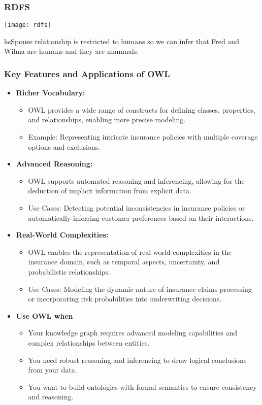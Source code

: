 \begin{frame}[fragile]\frametitle{RDFS}

\begin{center}
\texttt{[image: rdfs]}
\end{center}	  

hsSpouse relationship is restricted to humans so we can infer that Fred and Wilma are humans and they are mammals.
\end{frame}


\begin{frame}[fragile]
\frametitle{Key Features and Applications of OWL}
\begin{itemize}
\item \textbf{Richer Vocabulary:}
\begin{itemize}
\item OWL provides a wide range of constructs for defining classes, properties, and relationships, enabling more precise modeling.
\item Example: Representing intricate insurance policies with multiple coverage options and exclusions.
\end{itemize}

\item \textbf{Advanced Reasoning:}
\begin{itemize}
\item OWL supports automated reasoning and inferencing, allowing for the deduction of implicit information from explicit data.
\item Use Cases: Detecting potential inconsistencies in insurance policies or automatically inferring customer preferences based on their interactions.
\end{itemize}

\item \textbf{Real-World Complexities:}
\begin{itemize}
\item OWL enables the representation of real-world complexities in the insurance domain, such as temporal aspects, uncertainty, and probabilistic relationships.
\item Use Cases: Modeling the dynamic nature of insurance claims processing or incorporating risk probabilities into underwriting decisions.
\end{itemize}

\item \textbf{Use OWL when}
\begin{itemize}
\item Your knowledge graph requires advanced modeling capabilities and complex relationships between entities.
\item You need robust reasoning and inferencing to draw logical conclusions from your data.
\item You want to build ontologies with formal semantics to ensure consistency and reasoning.
\end{itemize}

\end{itemize}
\end{frame}

